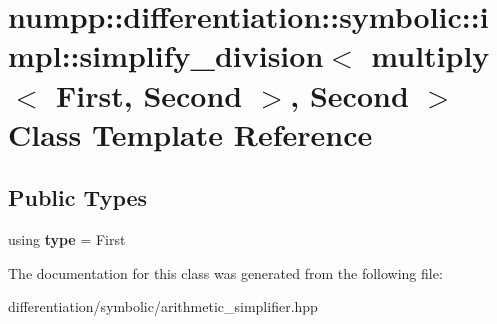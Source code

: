 \hypertarget{classnumpp_1_1differentiation_1_1symbolic_1_1impl_1_1simplify__division_3_01multiply_3_01First_0c33d7e82a36da3303a0a365fc4a46997}{}\section{numpp\+:\+:differentiation\+:\+:symbolic\+:\+:impl\+:\+:simplify\+\_\+division$<$ multiply$<$ First, Second $>$, Second $>$ Class Template Reference}
\label{classnumpp_1_1differentiation_1_1symbolic_1_1impl_1_1simplify__division_3_01multiply_3_01First_0c33d7e82a36da3303a0a365fc4a46997}
\subsection*{Public Types}
\begin{DoxyCompactItemize}
\item 
\mbox{\label{classnumpp_1_1differentiation_1_1symbolic_1_1impl_1_1simplify__division_3_01multiply_3_01First_0c33d7e82a36da3303a0a365fc4a46997_a61bfd20eb41fd1dae7d02f0657448a65}} 
using {\bfseries type} = First
\end{DoxyCompactItemize}


The documentation for this class was generated from the following file\+:\begin{DoxyCompactItemize}
\item 
differentiation/symbolic/arithmetic\+\_\+simplifier.\+hpp\end{DoxyCompactItemize}
